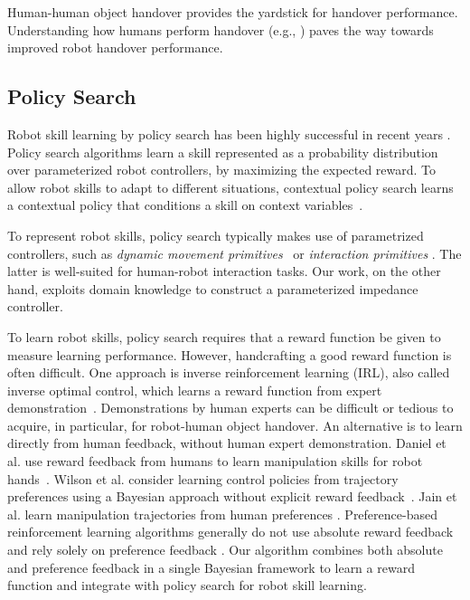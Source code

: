 Human-human object handover provides the yardstick for handover performance. Understanding how humans perform handover (e.g., \citep{ChaPar13,HubKup13}) paves the way towards improved robot handover performance.

\subsection{Policy Search} Robot skill learning by policy search has been highly successful in recent years \cite{Deisenroth2013}. Policy search algorithms learn a skill represented as a probability distribution over parameterized robot controllers, by maximizing the expected reward. To allow robot skills to adapt to different situations, contextual policy search learns a contextual policy that conditions a skill on context
variables~\citep{Silva2012, Daniel2012, Kupcsik2013}.

To represent robot skills, policy search typically makes use of  parametrized controllers, such as \emph{dynamic movement primitives}~\citep{Ijspeert2003} or \emph{interaction primitives} \citep{Heni_ICRA_2014}. The latter is well-suited for human-robot interaction tasks. Our work, on the other hand, exploits domain knowledge to construct a parameterized impedance controller. 

To learn robot skills, policy search requires that a reward function be given to measure learning performance.  However, handcrafting a good reward function is often difficult. One approach is inverse reinforcement learning (IRL), also called inverse optimal control, which learns a reward function from expert demonstration~\cite{Ng_ICML_2000,
  Ratliff_2009_AR}.  Demonstrations by human experts can be difficult or tedious to acquire, in particular, for robot-human object handover. An alternative is to learn  directly from human feedback, without human expert demonstration.  Daniel et al. use reward feedback from humans to learn manipulation skills for robot hands~\citep{Daniel_RSS_2014}. Wilson et al.  consider learning control policies from trajectory preferences using a Bayesian approach without explicit reward feedback~\citep{Wilson_NIPS_2012}.  Jain et al. learn manipulation trajectories from human preferences \citep{Jain_CoRR_2013}. Preference-based reinforcement learning algorithms generally do not use absolute reward feedback and rely solely on preference feedback \citep{Wirth_ECML_2013}. Our algorithm combines both absolute  and preference feedback in a single Bayesian framework to learn a reward function and integrate with policy search for robot skill learning.

